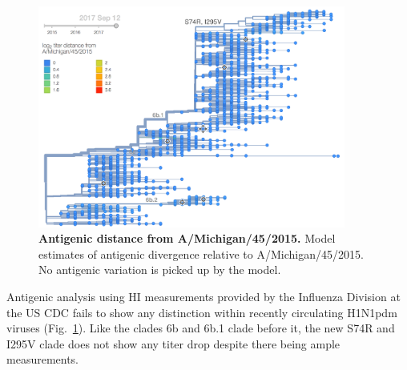 \documentclass[11pt,oneside,letterpaper]{article}
\newcommand{\FIG}[1]{Fig.~\ref{#1}}
\begin{document}
\clearpage
\begin{figure}[H]
  \centering
  \includegraphics[width=0.9\textwidth]{../figures/sep-2017/h1n1pdm_tree_titer_model.png}
  \caption{\textbf{Antigenic distance from A/Michigan/45/2015.}
  Model estimates of antigenic divergence relative to A/Michigan/45/2015.
  No antigenic variation is picked up by the model.
  }
  \label{h1n1pdm_tree_titer_model}
\end{figure}
Antigenic analysis using HI measurements provided by the Influenza
Division at the US CDC fails to show any distinction within recently
circulating H1N1pdm viruses (\FIG{h1n1pdm_tree_titer_model}). Like the clades 6b and 6b.1 clade before
it, the new S74R and I295V clade does not show any titer drop despite
there being ample measurements.
\end{document}
